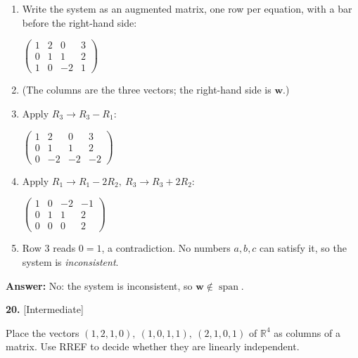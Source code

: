 \documentclass[11pt]{article}
\begin{document}
\begin{tcolorbox}[breakable,colback=ans,colframe=ansb,boxrule=0.5pt,left=4pt,right=4pt,top=2pt,bottom=2pt]\begin{enumerate}[leftmargin=2.2em,itemsep=1pt,topsep=1pt,label=\textbf{Step \arabic*.}]\item Write the system as an augmented matrix, one row per equation, with a bar before the right-hand side:\par\smallskip $\displaystyle \left(\begin{array}{ccc|c}1 & 2 & 0 & 3 \\ 0 & 1 & 1 & 2 \\ 1 & 0 & -2 & 1\end{array}\right)$
\item (The columns are the three vectors; the right-hand side is $\mathbf w$.)
\item Apply $R_3\to R_3-R_1$:\par\smallskip $\displaystyle \left(\begin{array}{ccc|c}1 & 2 & 0 & 3 \\ 0 & 1 & 1 & 2 \\ 0 & -2 & -2 & -2\end{array}\right)$
\item Apply $R_1\to R_1-2R_2,\ R_3\to R_3+2R_2$:\par\smallskip $\displaystyle \left(\begin{array}{ccc|c}1 & 0 & -2 & -1 \\ 0 & 1 & 1 & 2 \\ 0 & 0 & 0 & 2\end{array}\right)$
\item Row 3 reads $0=1$, a contradiction. No numbers $a,b,c$ can satisfy it, so the system is \emph{inconsistent}.
\end{enumerate}\textbf{Answer:} No: the system is inconsistent, so $\mathbf w\notin\operatorname{span}$.\end{tcolorbox}
\par\vspace{2pt}
\begin{minipage}{\linewidth}\textbf{20.} \hfill{\scriptsize\color{ink}[Intermediate]}\par\nopagebreak Place the vectors $(1,2,1,0),\ (1,0,1,1),\ (2,1,0,1)$ of $\mathbb{R}^{4}$ as columns of a matrix. Use RREF to decide whether they are linearly independent.
\end{minipage}\par\nopagebreak
\end{document}
